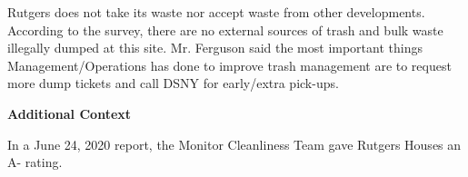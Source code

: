 Rutgers does not take its waste nor accept waste from other developments. According to the survey, there are no external sources of trash and bulk waste illegally dumped at this site. Mr. Ferguson said the most important things Management/Operations has done to improve trash management are to request more dump tickets and call DSNY for early/extra pick-ups.

\textbf{Additional Context}  

In a June 24, 2020 report, the Monitor Cleanliness Team gave Rutgers Houses an A- rating.  